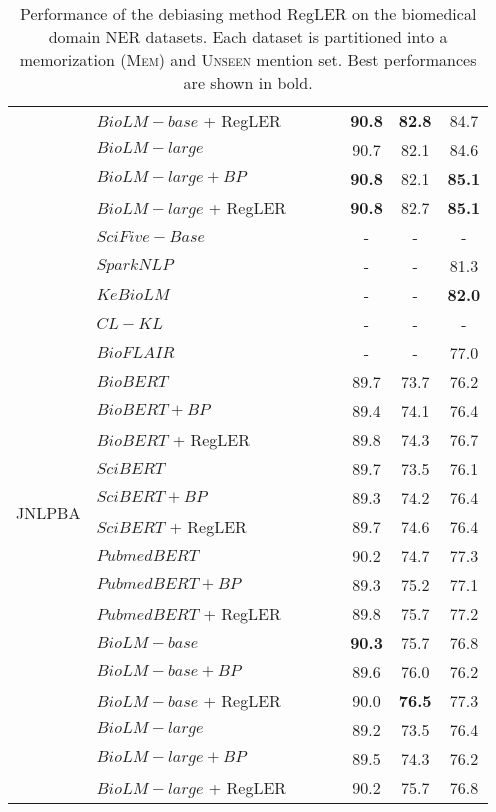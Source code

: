 \documentclass[11pt]{article}
\newcommand{\cmark}{\ding{51}}\newcommand{\xmark}{\ding{55}}\newcommand{\cross}{\ding{61}}\newcommand{\mb}[1]{\textcolor{red}{#1}}
\begin{document}
\begin{table*}[t]
\begin{adjustbox}{width=0.75\textwidth}
\begin{tabular}{ l l c c c c c c }
& $BioLM-base$ + RegLER & \cmark & \cmark & \cmark & \textbf{90.8} & \textbf{82.8} & 84.7 \\
\cmidrule{2-8}
& $BioLM-large$ & \xmark & \xmark & \xmark & 90.7 & 82.1 & 84.6 \\
& $BioLM-large + {BP}$ & \xmark & \xmark & \xmark & \textbf{90.8} & 82.1 & \textbf{85.1} \\
& $BioLM-large$ + RegLER & \cmark & \cmark & \cmark & \textbf{90.8} & 82.7 & \textbf{85.1} \\
\midrule
\multirow{21}{*}{JNLPBA}
& $SciFive-Base$ & \xmark & \xmark & \xmark & - & - & - \\
& $SparkNLP$ & \xmark & \xmark & \xmark & - & - & 81.3  \\
& $KeBioLM$ & \xmark & \xmark & \xmark & - & - & \textbf{82.0}  \\
& $CL - KL$ & \xmark & \xmark & \xmark & - & - & -  \\
& $BioFLAIR$ & \xmark & \xmark & \xmark & - & - & 77.0 \\
\cmidrule{2-8}
& $BioBERT$ & \xmark & \xmark & \xmark & 89.7 & 73.7 &  76.2 \\
& $BioBERT + {BP}$ & \xmark & \xmark & \xmark & 89.4 & 74.1 &  76.4 \\
& $BioBERT$ + RegLER & \cmark & \cmark & \cmark & 89.8 & 74.3 & 76.7 \\
\cmidrule{2-8}
& $SciBERT$ & \xmark & \xmark & \xmark & 89.7 & 73.5 & 76.1 \\
& $SciBERT + {BP}$ & \xmark & \xmark & \xmark & 89.3 & 74.2 & 76.4 \\
& $SciBERT$ + RegLER & \cmark & \cmark & \cmark & 89.7 & 74.6 &  76.4 \\
\cmidrule{2-8}
& $PubmedBERT$ & \xmark & \xmark & \xmark & 90.2 & 74.7 & 77.3 \\
& $PubmedBERT + {BP}$ & \xmark & \xmark & \xmark & 89.3 & 75.2 & 77.1 \\
& $PubmedBERT$ + RegLER & \cmark & \cmark & \cmark & 89.8 & 75.7 & 77.2 \\
\cmidrule{2-8}
& $BioLM-base$ & \xmark & \xmark & \xmark & \textbf{90.3} & 75.7 & 76.8 \\
& $BioLM-base + {BP}$ & \xmark & \xmark & \xmark & 89.6 & 76.0 & 76.2 \\
& $BioLM-base$ + RegLER & \cmark & \cmark & \cmark & 90.0 & \textbf{76.5} & 77.3 \\
\cmidrule{2-8}
& $BioLM-large$ & \xmark & \xmark & \xmark & 89.2 & 73.5 & 76.4 \\
& $BioLM-large + {BP}$ & \xmark & \xmark & \xmark & 89.5 & 74.3 & 76.2 \\
& $BioLM-large$ + RegLER & \cmark & \cmark & \cmark & 90.2 & 75.7 & 76.8 \\
\bottomrule
\end{tabular}
\end{adjustbox}
\caption{Performance of the debiasing method RegLER on the biomedical domain NER datasets. Each dataset is partitioned into a memorization (\textsc{Mem}) and \textsc{Unseen} mention set. Best performances are shown in bold.}
\label{tab:maintable 3}
\end{table*}
\end{document}
